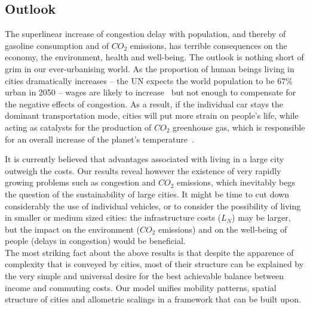 \subsection{Outlook}

The superlinear increase of congestion delay with population, and thereby of
gasoline consumption and of $CO_2$ emissions, has terrible consequences on the
economy, the environment, health and well-being. The outlook is nothing short of
grim in our ever-urbanising world. As the proportion of human beings living in
cities dramatically increases -- the UN expects the world population to be $67\%$
urban in 2050 -- wages are likely to 
increase~\cite{Bettencourt:2007} but not enough to compensate for the negative
effects of congestion. As a result, if the individual car stays the dominant
transportation mode, cities will put more strain on people's life, while acting
as catalysts for the production of $CO_2$ greenhouse gas, which is responsible for an
overall increase of the planet's temperature~\cite{Oreskes:2004}. 

It is currently believed that advantages associated with living in a large city
outweigh the costs. Our results reveal however the existence of very rapidly
growing problems such as congestion and $CO_2$ emissions, which inevitably begs
the question of the sustainability of large cities. It might be time to cut down
considerably the use of individual vehicles, or to consider the possibility of
living in smaller or medium sized cities: the infrastructure costs ($L_N$) may
be larger, but the impact on the environment ($CO_2$ emissions) and on the
well-being of people (delays in congestion) would be beneficial.\\

The most striking fact about the above results is that despite the apparence of
complexity that is conveyed by cities, most of their structure can be explained
by the very simple and universal desire for the best achievable balance between
income and commuting costs. Our model unifies mobility patterns, spatial
structure of cities and allometric scalings in a framework that can be built
upon. 
